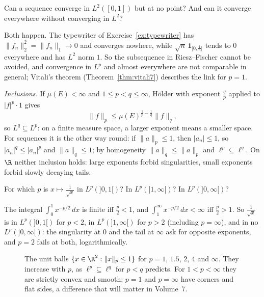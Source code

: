 \begin{think}
Can a sequence converge in $L^2([0,1])$ but at no point? And can it converge everywhere without converging in $L^2$?
\end{think}

Both happen. The typewriter of Exercise~\ref{ex:typewriter} has $\|f_n\|_2^2=\|f_n\|_1\to0$ and converges nowhere, while $\sqrt n\,\mathbf 1_{]0,\frac1n[}$ tends to $0$ everywhere and has $L^2$ norm $1$. So
the subsequence in Riesz--Fischer cannot be avoided, and convergence in $L^p$ and almost everywhere are not comparable in general; Vitali's theorem (Theorem~\ref{thm:vitali7}) describes the link for $p=1$.

\emph{Inclusions.} If $\mu(E)<\infty$ and $1\le p<q\le\infty$, H\"older with exponent $\frac qp$ applied to $|f|^p\cdot1$ gives
\[\|f\|_p\le\mu(E)^{\frac1p-\frac1q}\|f\|_q,\]
so $L^q\subseteq L^p$: on a finite measure space, a larger exponent means a smaller space. For sequences it is the other way round: if $\|a\|_p\le1$, then $|a_n|\le1$, so $|a_n|^q\le|a_n|^p$ and
$\|a\|_q\le1$; by homogeneity $\|a\|_q\le\|a\|_p$ and $\ell^p\subseteq\ell^q$. On $\R$ neither inclusion holds: large exponents forbid singularities, small exponents forbid slowly decaying tails.

\begin{think}
For which $p$ is $x\mapsto\frac1{\sqrt x}$ in $L^p(]0,1[)$? In $L^p(]1,\infty[)$? In $L^p(]0,\infty[)$?
\end{think}

The integral $\int_0^1x^{-p/2}\,dx$ is finite iff $\frac p2<1$, and $\int_1^\infty x^{-p/2}\,dx<\infty$ iff $\frac p2>1$. So $\frac1{\sqrt x}$ is in $L^p(]0,1[)$ for $p<2$, in $L^p(]1,\infty[)$ for $p>2$ (including $p=\infty$), and in no $L^p(]0,\infty[)$:
the singularity at $0$ and the tail at $\infty$ ask for opposite exponents, and $p=2$ fails at both, logarithmically.

\begin{figure}[ht]
\centering
{}
\caption{The unit balls $\{x\in\R^2:\|x\|_p\le1\}$ for $p=1$, $1.5$, $2$, $4$ and $\infty$. They increase with $p$, as $\ell^p\subseteq\ell^q$ for $p<q$ predicts. For $1<p<\infty$ they are strictly convex
and smooth; $p=1$ and $p=\infty$ have corners and flat sides, a difference that will matter in Volume~7.}
\label{fig:lpballs}
\end{figure}

